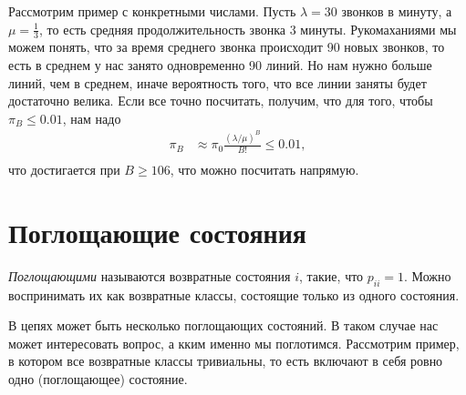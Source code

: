 \documentclass[12pt]{article}
\begin{document}
Рассмотрим пример с конкретными числами. Пусть $\lambda = 30$ звонков в минуту, а $\mu = \frac{1}{3}$, то есть средняя продолжительность звонка $3$ минуты. Рукомаханиями мы можем понять, что за время среднего звонка происходит 90 новых звонков, то есть в среднем у нас занято одновременно 90 линий. Но нам нужно больше линий, чем в среднем, иначе вероятность того, что все линии заняты будет достаточно велика. Если все точно посчитать, получим, что для того, чтобы $\pi_B \le 0.01$, нам надо
\begin{align*}
  \pi_B &\approx \pi_0 \frac{(\lambda/\mu)^B}{B!} \le 0.01, \\
\end{align*} 
что достигается при $B \ge 106$, что можно посчитать напрямую.

\section{Поглощающие состояния}

\emph{Поглощающими} называются возвратные состояния $i$, такие, что $p_{ii} = 1$. Можно воспринимать их как возвратные классы, состоящие только из одного состояния. 

В цепях может быть несколько поглощающих состояний. В таком случае нас может интересовать вопрос, а кким именно мы поглотимся. Рассмотрим пример, в котором все возвратные классы тривиальны, то есть включают в себя ровно одно (поглощающее) состояние.

\begin{center}
\end{center}
\end{document}

